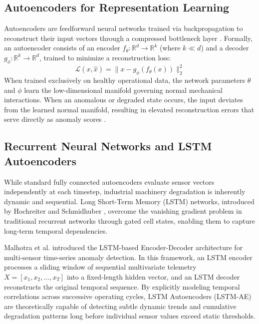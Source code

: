 \documentclass[12pt,a4paper,oneside]{report}
\begin{document}
\subsection{Autoencoders for Representation Learning}
Autoencoders are feedforward neural networks trained via backpropagation to reconstruct their input vectors through a compressed bottleneck layer \cite{vincent2008extracting}. Formally, an autoencoder consists of an encoder $f_\theta: \mathbb{R}^d \rightarrow \mathbb{R}^k$ (where $k \ll d$) and a decoder $g_\phi: \mathbb{R}^k \rightarrow \mathbb{R}^d$, trained to minimize a reconstruction loss:
\begin{equation}
    \mathcal{L}(x, \hat{x}) = \|x - g_\phi(f_\theta(x))\|_2^2
\end{equation}
When trained exclusively on healthy operational data, the network parameters $\theta$ and $\phi$ learn the low-dimensional manifold governing normal mechanical interactions. When an anomalous or degraded state occurs, the input deviates from the learned normal manifold, resulting in elevated reconstruction errors that serve directly as anomaly scores \cite{zhou2017anomaly}.

\subsection{Recurrent Neural Networks and LSTM Autoencoders}
While standard fully connected autoencoders evaluate sensor vectors independently at each timestep, industrial machinery degradation is inherently dynamic and sequential. Long Short-Term Memory (LSTM) networks, introduced by Hochreiter and Schmidhuber \cite{hochreiter1997long}, overcome the vanishing gradient problem in traditional recurrent networks through gated cell states, enabling them to capture long-term temporal dependencies.

Malhotra et al. \cite{malhotra2016lstm} introduced the LSTM-based Encoder-Decoder architecture for multi-sensor time-series anomaly detection. In this framework, an LSTM encoder processes a sliding window of sequential multivariate telemetry $X = [x_1, x_2, \dots, x_T]$ into a fixed-length hidden vector, and an LSTM decoder reconstructs the original temporal sequence. By explicitly modeling temporal correlations across successive operating cycles, LSTM Autoencoders (LSTM-AE) are theoretically capable of detecting subtle dynamic trends and cumulative degradation patterns long before individual sensor values exceed static thresholds.
\end{document}
